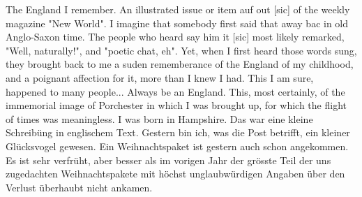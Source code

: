 \def\day{6. Oktober 1942}
\mktitle

The England I remember.
An illustrated issue or item auf out{\color{red} [sic] } of the weekly magazine "New World".
I imagine that somebody first said that away bac in old Anglo-Saxon time.
The people who heard say him it{\color{red} [sic] } most likely remarked, "Well, naturally!", and "poetic chat, eh".
Yet, when I first heard those words sung, they brought back to me a suden rememberance of the England of my childhood, and a poignant affection for it, more than I knew I had.
This I am sure, happened to many people...
Always be an England.
This, most certainly, of the immemorial image of Porchester in which I was brought up, for which the flight of times was meaningless.
I was born in Hampshire.
Das war eine kleine Schreib\"{u}ng in englischem Text.
Gestern bin ich, was die Post betrifft, ein kleiner Gl\"{u}cksvogel gewesen.
Ein Weihnachtspaket ist gestern auch schon angekommen.
Es ist sehr verfr\"{u}ht, aber besser als im vorigen Jahr der gr\"{o}sste Teil der uns zugedachten Weihnachtspakete mit h\"{o}chst unglaubw\"{u}rdigen Angaben \"{u}ber den Verlust \"{u}berhaubt nicht ankamen.

\clearpage
